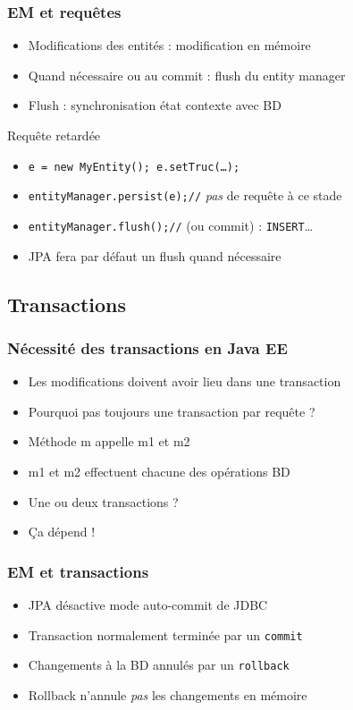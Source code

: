 \documentclass[french, english]{beamer}
\begin{document}
\begin{frame}
	\frametitle{EM et requêtes}
	\begin{itemize}
		\item Modifications des entités : modification en mémoire
		\item Quand nécessaire ou au commit : flush du entity manager
		\item Flush : synchronisation état contexte avec BD
	\end{itemize}
	\begin{exampleblock}{Requête retardée}
		\begin{itemize}
			\item \texttt{e = new MyEntity(); e.setTruc(…);}
			\item \texttt{entityManager.persist(e);//} \emph{pas} de requête à ce stade
			\item \texttt{entityManager.flush();//} (ou commit) : \texttt{INSERT}…
		\end{itemize}
	\end{exampleblock}
	\begin{itemize}
		\item JPA fera {\tiny par défaut} un flush quand nécessaire
	\end{itemize}
\end{frame}

\subsection{Transactions}
\begin{frame}
	\frametitle{Nécessité des transactions en Java EE}
	\begin{itemize}
		\item Les modifications doivent avoir lieu dans une transaction
		\item Pourquoi pas toujours une transaction par requête ? \pause
		\item Méthode m appelle m1 et m2
		\item m1 et m2 effectuent chacune des opérations BD
		\item Une ou deux transactions ? \pause
		\item Ça dépend !
	\end{itemize}
\end{frame}

\begin{frame}
	\frametitle{EM et transactions}
	\begin{itemize}
		\item JPA désactive mode auto-commit de JDBC
		\item Transaction {\tiny normalement} terminée par un \texttt{commit}
		\item Changements à la BD annulés par un \texttt{rollback}
		\item Rollback n’annule \emph{pas} les changements en mémoire
	\end{itemize}
\end{frame}
\end{document}
